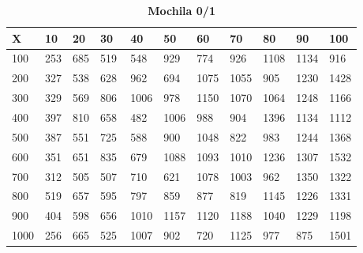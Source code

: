 \documentclass[10pt,letterpaper]{article}
\begin{document}
\newpage 
{}
\begin{center}
\begin{table}\renewcommand{\arraystretch}{2.5}
\caption{\large \textbf{Mochila 0/1}}
\centering
\begin{tabular} { |m{0.5cm}|m{1.3cm}|m{1.3cm}|m{1.3cm}|m{1.3cm}|m{1.3cm}|m{1.3cm}|m{1.3cm}|m{1.3cm}|m{1.3cm}|m{1.3cm}|} 
\hline
\rowcolor{Gray}
\centering \textbf{X} & \centering \textbf{10} & \centering \textbf{20} & \centering \textbf{30}\ & \centering \textbf{40} & \centering \textbf{50} & \centering \textbf{60}\ & \centering \textbf{70} & \centering \textbf{80} & \centering \textbf{90}\ & \textbf{100} \\\hline
\cellcolor{Gray}100 & \Large 253 & \Large 685 & \Large 519 & \Large 548 & \Large 929 & \Large 774 & \Large 926 & \Large 1108 & \Large 1134 & \Large 916 \\
\hline
\cellcolor{Gray}200 & \Large 327 & \Large 538 & \Large 628 & \Large 962 & \Large 694 & \Large 1075 & \Large 1055 & \Large 905 & \Large 1230 & \Large 1428 \\
\hline
\cellcolor{Gray}300 & \Large 329 & \Large 569 & \Large 806 & \Large 1006 & \Large 978 & \Large 1150 & \Large 1070 & \Large 1064 & \Large 1248 & \Large 1166 \\
\hline
\cellcolor{Gray}400 & \Large 397 & \Large 810 & \Large 658 & \Large 482 & \Large 1006 & \Large 988 & \Large 904 & \Large 1396 & \Large 1134 & \Large 1112 \\
\hline
\cellcolor{Gray}500 & \Large 387 & \Large 551 & \Large 725 & \Large 588 & \Large 900 & \Large 1048 & \Large 822 & \Large 983 & \Large 1244 & \Large 1368 \\
\hline
\cellcolor{Gray}600 & \Large 351 & \Large 651 & \Large 835 & \Large 679 & \Large 1088 & \Large 1093 & \Large 1010 & \Large 1236 & \Large 1307 & \Large 1532 \\
\hline
\cellcolor{Gray}700 & \Large 312 & \Large 505 & \Large 507 & \Large 710 & \Large 621 & \Large 1078 & \Large 1003 & \Large 962 & \Large 1350 & \Large 1322 \\
\hline
\cellcolor{Gray}800 & \Large 519 & \Large 657 & \Large 595 & \Large 797 & \Large 859 & \Large 877 & \Large 819 & \Large 1145 & \Large 1226 & \Large 1331 \\
\hline
\cellcolor{Gray}900 & \Large 404 & \Large 598 & \Large 656 & \Large 1010 & \Large 1157 & \Large 1120 & \Large 1188 & \Large 1040 & \Large 1229 & \Large 1198 \\
\hline
\cellcolor{Gray}1000 & \Large 256 & \Large 665 & \Large 525 & \Large 1007 & \Large 902 & \Large 720 & \Large 1125 & \Large 977 & \Large 875 & \Large 1501 \\
\hline
\end{tabular} \\
\end{table}
\end{center}
\end{document}
